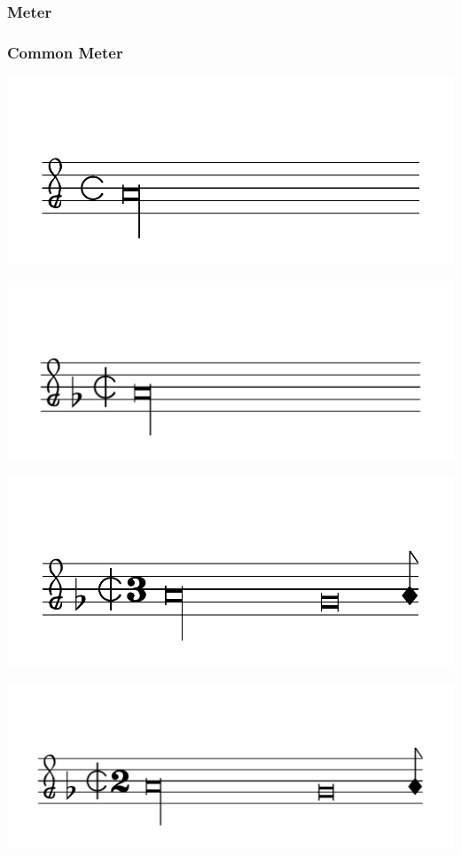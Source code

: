 \documentclass{article}
\begin{document}
    \subsubsection{Meter}
    \subsubsection*{Common Meter}
        \includegraphics[scale=0.5]{figures_tests/pdf/smens/commonmeter1.pdf}

        \includegraphics[scale=0.5]{figures_tests/pdf/smens/commonmeter2.pdf}

        \includegraphics[scale=0.5]{figures_tests/pdf/smens/commonmeter3.pdf}

        \includegraphics[scale=0.5]{figures_tests/pdf/smens/commonmeter4.pdf}
\end{document}
